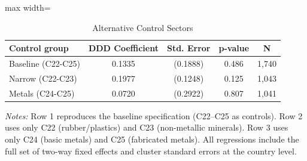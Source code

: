 \begin{table}[H]
\centering
\caption{Alternative Control Sectors}
\label{tab:alt_controls}

\begin{adjustbox}{max width=\textwidth}\begin{tabular}{lcccc}
\toprule
Control group & DDD Coefficient & Std. Error & p-value & N \\
\midrule
Baseline (C22-C25) & 0.1335 & (0.1888) & 0.486 & 1,740 \\
Narrow (C22-C23) & 0.1977 & (0.1248) & 0.125 & 1,043 \\
Metals (C24-C25) & 0.0720 & (0.2922) & 0.807 & 1,041 \\
\bottomrule
\end{tabular}\end{adjustbox}
\par\vspace{0.3em}

\textit{Notes:} Row 1 reproduces the baseline specification (C22--C25 as controls). Row 2 uses only C22 (rubber/plastics) and C23 (non-metallic minerals). Row 3 uses only C24 (basic metals) and C25 (fabricated metals). All regressions include the full set of two-way fixed effects and cluster standard errors at the country level.


\end{table}

